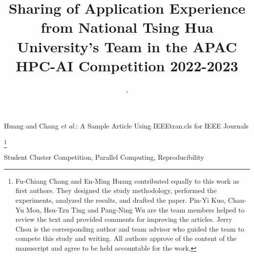 \documentclass[lettersize,journal]{IEEEtran}
\newcommand\blfootnote[1]{%
  \begingroup
  \renewcommand\thefootnote{}\footnote{#1}%
  \addtocounter{footnote}{-1}%
  \endgroup
}
\begin{document}
\title{Sharing of Application Experience from National Tsing Hua University's Team in the APAC HPC-AI Competition 2022-2023}


\author{, 
}



%
{Huang and Chang \MakeLowercase{\textit{et al.}}: A Sample Article Using IEEEtran.cls for IEEE Journals}


\maketitle

\blfootnote{Fu-Chiang Chang and En-Ming Huang contributed equally to this work as first authors. They designed the study methodology, performed the experiments, analyzed the results, and drafted the paper. Pin-Yi Kuo, Chan-Yu Mou, Hsu-Tzu Ting and Pang-Ning Wu are the team members helped to review the text and provided comments for improving the articles. Jerry Chou is the corresponding author and team advisor who guided the team to compete this study and writing. All authors approve of the content of the manuscript and agree to be held accountable for the work.}



\begin{IEEEkeywords}
Student Cluster Competition, Parallel Computing, Reproducibility
\end{IEEEkeywords}












\end{document}
